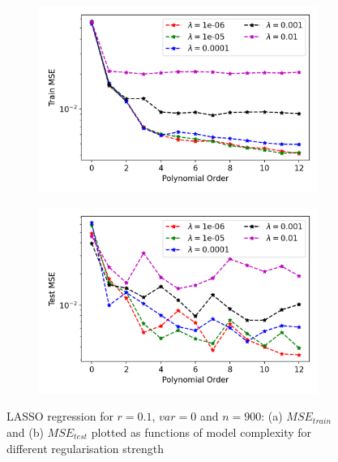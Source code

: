 \begin{figure}
\centering
\begin{subfigure}{.5\textwidth}
  \centering
  \includegraphics[width=.9\linewidth]{Images/lasso7b.png}
  \caption{}
  \label{fig:lasso7}
\end{subfigure}%
\begin{subfigure}{.5\textwidth}
  \centering
  \includegraphics[width=.9\linewidth]{Images/lasso7.png}
  \caption{}
  \label{fig:lasso7b}
\end{subfigure}
\caption{LASSO regression for $r=0.1$, $var=0$ and $n=900$: (a) $MSE_{train}$ and (b) $MSE_{test}$ plotted as functions of model complexity for different regularisation strength}
\label{fig:Lasso1}
\end{figure}

